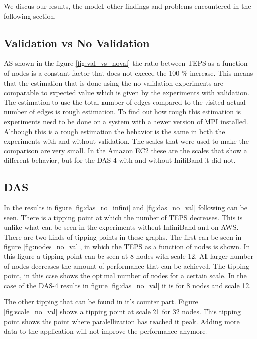 We discus our results, the model, other findings and problems encountered in the following section.

\subsection{Validation vs No Validation}
\label{dis:val}
AS shown in the figure \ref{fig:val_vs_noval} the ratio between TEPS as a function of nodes is a constant factor that does not exceed the 100 \% increase. This means that the estimation that is done using the no validation experiments are comparable to expected value which is given by the experiments with validation. The estimation to use the total number of edges compared to the visited actual number of edges is rough estimation. To find out how rough this estimation is experiments need to be done on a system with a newer version of MPI installed. Although this is a rough estimation the behavior is the same in both the experiments with and without validation.
The scales that were used to make the comparison are very small. In the Amazon EC2 these are the scales that show a different behavior, but for the DAS-4 with and without InifiBand it did not. 

\subsection{DAS}
In the results in figure \ref{fig:das_no_infini} and  \ref{fig:das_no_val} following can be seen. There is a tipping point at which the number of TEPS decreases. This is unlike what can be seen in the experiments without InfiniBand and on AWS. There are two kinds of tipping points in these graphs. The first can be seen in  figure \ref{fig:nodes_no_val}, in which the TEPS as a function of nodes is shown. In this figure a tipping point can be seen at 8 nodes with scale 12. All larger number of nodes decreases the amount of performance that can be achieved. The tipping point, in this case shows the optimal number of nodes for a certain scale. In the case of the DAS-4 results in figure \ref{fig:das_no_val} it is for 8 nodes and scale 12.

The other tipping that can be found in it's counter part. Figure \ref{fig:scale_no_val} shows a tipping point at scale 21 for 32 nodes. This tipping point shows the point where paralellization has reached it peak. Adding more data to the application will not improve the performance anymore. 

